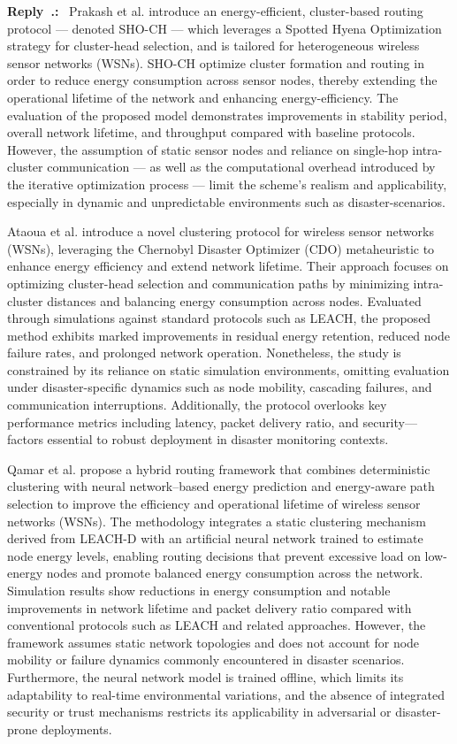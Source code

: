 \documentclass[11pt]{article}
\newcounter{reviewer}
\newcounter{replyctr}[reviewer]
\renewcommand{\thereplyctr}{\thereviewer.\arabic{replyctr}}
\newenvironment{reply}
  {\refstepcounter{replyctr}%
   \addtocounter{replyctr}{-1}%
   \medskip\noindent
   \begin{sf}\textbf{Reply~\thereplyctr:}\ }
  {\addtocounter{replyctr}{1}%
   \medskip\end{sf}}
\begin{document}
\begin{refsection}
\begin{mdframed}[style=Resp]
\begin{reply}
Prakash et al. \cite{prakash2025enhanced} introduce an energy-efficient, cluster-based routing protocol — denoted SHO-CH — which leverages a Spotted Hyena Optimization strategy for cluster-head selection, and is tailored for heterogeneous wireless sensor networks (WSNs). SHO-CH optimize cluster formation and routing in order to reduce energy consumption across sensor nodes, thereby extending the operational lifetime of the network and enhancing energy-efficiency. The evaluation of the proposed model demonstrates improvements in stability period, overall network lifetime, and throughput compared with baseline protocols. However, the assumption of static sensor nodes and reliance on single-hop intra-cluster communication — as well as the computational overhead introduced by the iterative optimization process — limit the scheme’s realism and applicability, especially in dynamic and unpredictable environments such as disaster-scenarios. 

Ataoua et al. \cite{ataoua_chernobyl_2025} introduce a novel clustering protocol for wireless sensor networks (WSNs), leveraging the Chernobyl Disaster Optimizer (CDO) metaheuristic to enhance energy efficiency and extend network lifetime. Their approach focuses on optimizing cluster-head selection and communication paths by minimizing intra-cluster distances and balancing energy consumption across nodes. Evaluated through simulations against standard protocols such as LEACH, the proposed method exhibits marked improvements in residual energy retention, reduced node failure rates, and prolonged network operation. Nonetheless, the study is constrained by its reliance on static simulation environments, omitting evaluation under disaster-specific dynamics such as node mobility, cascading failures, and communication interruptions. Additionally, the protocol overlooks key performance metrics including latency, packet delivery ratio, and security—factors essential to robust deployment in disaster monitoring contexts.

Qamar et al. \cite{qamar_hybrid_2025} propose a hybrid routing framework that combines deterministic clustering with neural network–based energy prediction and energy-aware path selection to improve the efficiency and operational lifetime of wireless sensor networks (WSNs). The methodology integrates a static clustering mechanism derived from LEACH-D with an artificial neural network trained to estimate node energy levels, enabling routing decisions that prevent excessive load on low-energy nodes and promote balanced energy consumption across the network. Simulation results show reductions in energy consumption and notable improvements in network lifetime and packet delivery ratio compared with conventional protocols such as LEACH and related approaches. However, the framework assumes static network topologies and does not account for node mobility or failure dynamics commonly encountered in disaster scenarios. Furthermore, the neural network model is trained offline, which limits its adaptability to real-time environmental variations, and the absence of integrated security or trust mechanisms restricts its applicability in adversarial or disaster-prone deployments.


\end{reply}
\end{mdframed}
\end{refsection}
\end{document}

